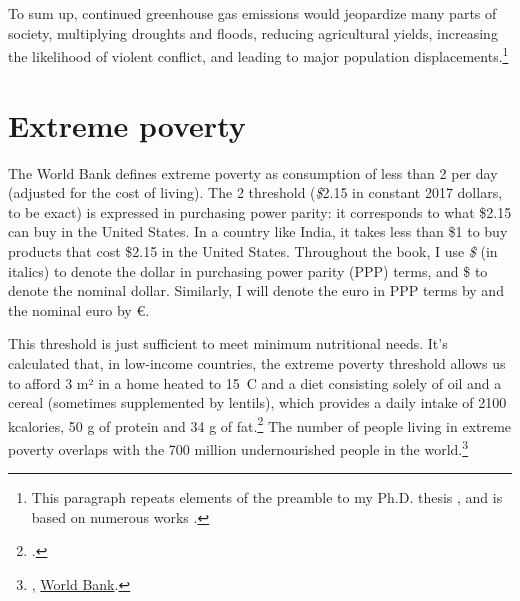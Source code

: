 \documentclass[a5paper,english,openany]{memoir}
\begin{document}
To sum up, continued greenhouse gas emissions would jeopardize %
many parts of society, multiplying droughts and floods, reducing agricultural yields, increasing the likelihood of violent conflict, and leading to major population displacements.\footnote{This paragraph repeats elements of the preamble to my Ph.D. thesis \citep{fabre_is_2020}, and is based on numerous works \citep{cattaneo_human_2019,carleton_social_2016,dell_temperature_2012}.} 


\section*{Extreme poverty} %

The World Bank defines extreme poverty as consumption of less than \textit{\texteuro{}}2 per day (adjusted for the cost of living). The \textit{\texteuro{}}2 threshold (\textit{\$}2.15 in constant 2017 dollars, to be exact) is expressed in purchasing power parity: it corresponds to what \$2.15 can buy in the United States. In a country like India, it takes less than \$1 to buy products that cost \$2.15 in the United States. %
Throughout the book, I %
use \textit{\$} (in italics) to denote the dollar in purchasing power parity (PPP) terms, and \$ to denote the nominal dollar. Similarly, I %
will denote the euro in PPP terms by \textit{\texteuro{}} and the nominal euro by \euro{}. %

This threshold is just sufficient to meet minimum nutritional needs. 
It's calculated that, in low-income countries, the extreme poverty threshold allows us to afford 3 m² in a home heated to 15~\textdegree{}C and a diet consisting solely of oil and a cereal (sometimes supplemented by lentils), which provides a daily intake of 2100 kcalories, 50 g of protein and 34 g of fat.\footnote{\citet{allen_absolute_2017}.} %
The number of people living in extreme poverty overlaps with the 700 million undernourished people in the world.\footnote{\citet{fao_state_2023}, \href{https://data.worldbank.org/indicator/SI.POV.DDAY?end=2019&locations=MW-1W&start=1990&view=chart}{World Bank}.} 
\end{document}
